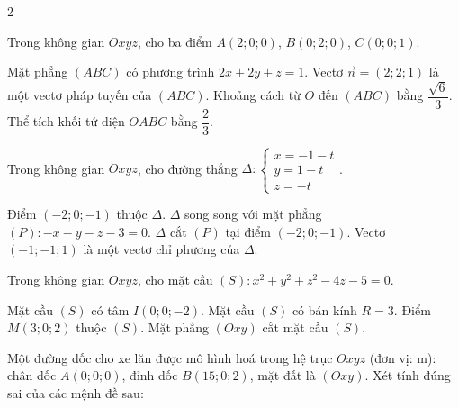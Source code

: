 \begin{deontap}{2}
\begin{cau}
\end{cau}
\phanII
\begin{cau}Trong không gian $Oxyz$, cho ba điểm $A(2;0;0)$, $B(0;2;0)$, $C(0;0;1)$.
\begin{dungsai}
  \y Mặt phẳng $(ABC)$ có phương trình $2x+2y+z=1$. \oDS
  \y Vectơ $\vec n=(2;2;1)$ là một vectơ pháp tuyến của $(ABC)$. \oDS
  \y Khoảng cách từ $O$ đến $(ABC)$ bằng $\dfrac{\sqrt{6}}{3}$. \oDS
  \y Thể tích khối tứ diện $OABC$ bằng $\dfrac{2}{3}$. \oDS
\end{dungsai}
\end{cau}
\begin{cau}Trong không gian $Oxyz$, cho đường thẳng $\Delta\colon \begin{cases}x=-1-t\\y=1-t\\z=-t\end{cases}$.
\begin{dungsai}
  \y Điểm $(-2;0;-1)$ thuộc $\Delta$. \oDS
  \y $\Delta$ song song với mặt phẳng $(P)\colon -x-y-z-3=0$. \oDS
  \y $\Delta$ cắt $(P)$ tại điểm $(-2;0;-1)$. \oDS
  \y Vectơ $(-1;-1;1)$ là một vectơ chỉ phương của $\Delta$. \oDS
\end{dungsai}
\end{cau}
\begin{cau}Trong không gian $Oxyz$, cho mặt cầu $(S)\colon x^2+y^2+z^2-4z-5=0$.
\begin{dungsai}
  \y Mặt cầu $(S)$ có tâm $I(0;0;-2)$. \oDS
  \y Mặt cầu $(S)$ có bán kính $R=3$. \oDS
  \y Điểm $M(3;0;2)$ thuộc $(S)$. \oDS
  \y Mặt phẳng $(Oxy)$ cắt mặt cầu $(S)$. \oDS
\end{dungsai}
\end{cau}
\begin{cau}Một đường dốc cho xe lăn được mô hình hoá trong hệ trục $Oxyz$ (đơn vị: m): chân dốc $A(0;0;0)$, đỉnh dốc $B(15;0;2)$, mặt đất là $(Oxy)$. Xét tính đúng sai của các mệnh đề sau:


\end{cau}
\end{deontap}
